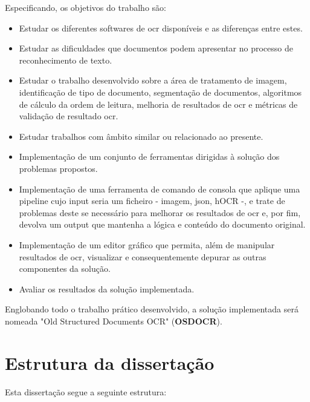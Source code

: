 Especificando, os objetivos do trabalho são:
\begin{itemize}
    \item Estudar os diferentes softwares de \acrshort{ocr} disponíveis e as diferenças entre estes.
    \item Estudar as dificuldades que documentos podem apresentar no processo de reconhecimento de texto.
    \item Estudar o trabalho desenvolvido sobre a área de tratamento de imagem, identificação de tipo de documento, segmentação de documentos, algoritmos de cálculo da ordem de leitura, melhoria de resultados de \acrshort{ocr} e métricas de validação de resultado \acrshort{ocr}.
    \item Estudar trabalhos com âmbito similar ou relacionado ao presente.
    \item Implementação de um conjunto de ferramentas dirigidas à solução dos problemas propostos.
    \item Implementação de uma ferramenta de comando de consola que aplique uma pipeline cujo input seria um ficheiro - imagem, json, hOCR -, e trate de problemas deste se necessário para melhorar os resultados de \acrshort{ocr} e, por fim, devolva um output que mantenha a lógica e conteúdo do documento original.
    \item Implementação de um editor gráfico que permita, além de manipular resultados de \acrshort{ocr}, visualizar e consequentemente depurar as outras componentes da solução.
    \item Avaliar os resultados da solução implementada.
\end{itemize}

Englobando todo o trabalho prático desenvolvido, a solução implementada será nomeada "Old Structured Documents OCR" (\textbf{OSDOCR}).



\section{Estrutura da dissertação}

Esta dissertação segue a seguinte estrutura:


